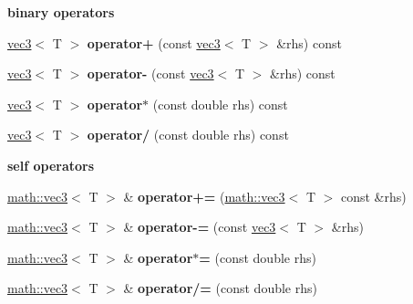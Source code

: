 \begin{Indent}{\bf binary operators}\par
{\em \label{_amgrp04c8a55c25fdc9a3444da113de31256d}
 }\begin{DoxyCompactItemize}
\item 
\hypertarget{classmath_1_1vec3_adaf198c54d56f4bf4493b91919f6eb8e}{
\hyperlink{classmath_1_1vec3}{vec3}$<$ T $>$ {\bfseries operator+} (const \hyperlink{classmath_1_1vec3}{vec3}$<$ T $>$ \&rhs) const }
\label{classmath_1_1vec3_adaf198c54d56f4bf4493b91919f6eb8e}

\item 
\hypertarget{classmath_1_1vec3_ab79da731edca6736172a2ec4bc7a9be7}{
\hyperlink{classmath_1_1vec3}{vec3}$<$ T $>$ {\bfseries operator-\/} (const \hyperlink{classmath_1_1vec3}{vec3}$<$ T $>$ \&rhs) const }
\label{classmath_1_1vec3_ab79da731edca6736172a2ec4bc7a9be7}

\item 
\hypertarget{classmath_1_1vec3_a0158485443f1a333c17d68f48ec1534b}{
\hyperlink{classmath_1_1vec3}{vec3}$<$ T $>$ {\bfseries operator$\ast$} (const double rhs) const }
\label{classmath_1_1vec3_a0158485443f1a333c17d68f48ec1534b}

\item 
\hypertarget{classmath_1_1vec3_afb842d06e9ee3d446c01b16ed870f20b}{
\hyperlink{classmath_1_1vec3}{vec3}$<$ T $>$ {\bfseries operator/} (const double rhs) const }
\label{classmath_1_1vec3_afb842d06e9ee3d446c01b16ed870f20b}

\end{DoxyCompactItemize}
\end{Indent}
\begin{Indent}{\bf self operators}\par
{\em \label{_amgrpf8b7a2ea730234c9f4b728de7bf6a056}
 }\begin{DoxyCompactItemize}
\item 
\hypertarget{classmath_1_1vec3_a04f6aee5e3b4bcf9283b844bd279b399}{
\hyperlink{classmath_1_1vec3}{math::vec3}$<$ T $>$ \& {\bfseries operator+=} (\hyperlink{classmath_1_1vec3}{math::vec3}$<$ T $>$ const \&rhs)}
\label{classmath_1_1vec3_a04f6aee5e3b4bcf9283b844bd279b399}

\item 
\hypertarget{classmath_1_1vec3_ad46ac632fb51c7dbcd0bf92bff1da878}{
\hyperlink{classmath_1_1vec3}{math::vec3}$<$ T $>$ \& {\bfseries operator-\/=} (const \hyperlink{classmath_1_1vec3}{vec3}$<$ T $>$ \&rhs)}
\label{classmath_1_1vec3_ad46ac632fb51c7dbcd0bf92bff1da878}

\item 
\hypertarget{classmath_1_1vec3_a816296f3311ad6124f7f210a047ca9a7}{
\hyperlink{classmath_1_1vec3}{math::vec3}$<$ T $>$ \& {\bfseries operator$\ast$=} (const double rhs)}
\label{classmath_1_1vec3_a816296f3311ad6124f7f210a047ca9a7}

\item 
\hypertarget{classmath_1_1vec3_ae189ca8cec1e6548d3603e81addeeda3}{
\hyperlink{classmath_1_1vec3}{math::vec3}$<$ T $>$ \& {\bfseries operator/=} (const double rhs)}
\label{classmath_1_1vec3_ae189ca8cec1e6548d3603e81addeeda3}

\end{DoxyCompactItemize}
\end{Indent}
